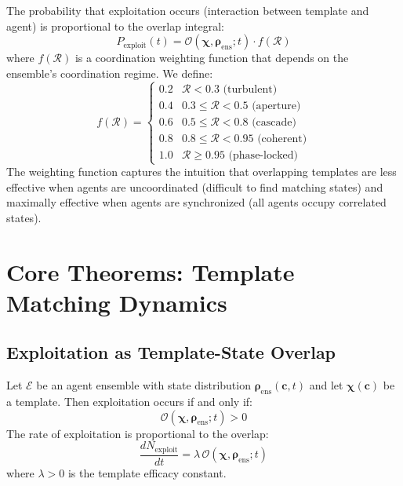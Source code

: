 \documentclass[11pt,twocolumn,a4paper]{article}
\newcommand{\Template}{\boldsymbol{\chi}}
\newcommand{\State}{\boldsymbol{\rho}}
\newcommand{\Coord}{\mathcal{R}}
\newcommand{\Overlap}{\mathcal{O}}
\begin{document}
\begin{definition}
The probability that exploitation occurs (interaction between template and agent) is proportional to the overlap integral:
\begin{equation}
P_{\mathrm{exploit}}(t) = \Overlap(\Template, \State_{\mathrm{ens}}; t) \cdot f(\Coord)
\label{eq:exploit_prob}
\end{equation}
where $f(\Coord)$ is a coordination weighting function that depends on the ensemble's coordination regime. We define:
\begin{equation}
f(\Coord) = \begin{cases}
0.2 & \Coord < 0.3 \text{ (turbulent)} \\
0.4 & 0.3 \le \Coord < 0.5 \text{ (aperture)} \\
0.6 & 0.5 \le \Coord < 0.8 \text{ (cascade)} \\
0.8 & 0.8 \le \Coord < 0.95 \text{ (coherent)} \\
1.0 & \Coord \ge 0.95 \text{ (phase-locked)}
\end{cases}
\label{eq:coordination_weighting}
\end{equation}
The weighting function captures the intuition that overlapping templates are less effective when agents are uncoordinated (difficult to find matching states) and maximally effective when agents are synchronized (all agents occupy correlated states).
\end{definition}

\section{Core Theorems: Template Matching Dynamics}
\label{sec:core_theorems}

\subsection{Exploitation as Template-State Overlap}

\begin{theorem}
\label{thm:exploit_overlap}
Let $\mathcal{E}$ be an agent ensemble with state distribution $\State_{\mathrm{ens}}(\mathbf{c}, t)$ and let $\Template(\mathbf{c})$ be a template. Then exploitation occurs if and only if:
\begin{equation}
\Overlap(\Template, \State_{\mathrm{ens}}; t) > 0
\label{eq:exploit_condition}
\end{equation}
The rate of exploitation is proportional to the overlap:
\begin{equation}
\frac{dN_{\mathrm{exploit}}}{dt} = \lambda \, \Overlap(\Template, \State_{\mathrm{ens}}; t)
\label{eq:exploit_rate}
\end{equation}
where $\lambda > 0$ is the template efficacy constant.
\end{theorem}
\end{document}
